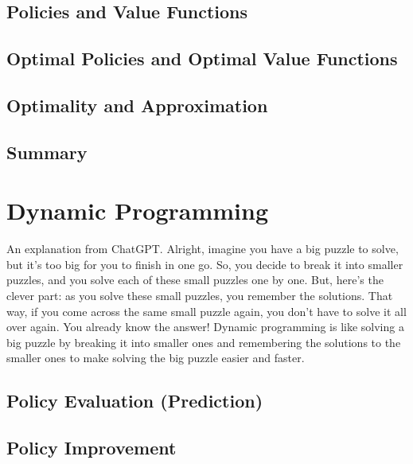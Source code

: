 \documentclass[
  letterpaper,
  DIV=11,
  numbers=noendperiod]{scrreprt}
\theoremstyle{definition}
\theoremstyle{remark}
\begin{document}
\section{Policies and Value
Functions}\label{policies-and-value-functions}

\section{Optimal Policies and Optimal Value
Functions}\label{optimal-policies-and-optimal-value-functions}

\section{Optimality and
Approximation}\label{optimality-and-approximation}

\section{Summary}\label{summary}


\chapter{Dynamic Programming}\label{dynamic-programming}

An explanation from ChatGPT. Alright, imagine you have a big puzzle to
solve, but it's too big for you to finish in one go. So, you decide to
break it into smaller puzzles, and you solve each of these small puzzles
one by one. But, here's the clever part: as you solve these small
puzzles, you remember the solutions. That way, if you come across the
same small puzzle again, you don't have to solve it all over again. You
already know the answer! Dynamic programming is like solving a big
puzzle by breaking it into smaller ones and remembering the solutions to
the smaller ones to make solving the big puzzle easier and faster.

\section{Policy Evaluation
(Prediction)}\label{policy-evaluation-prediction}

\section{Policy Improvement}\label{policy-improvement}
\end{document}
